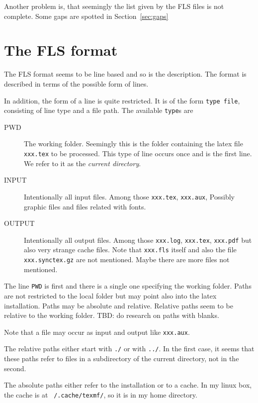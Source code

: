 \documentclass[a4paper]{article}
\begin{document}
Another problem is, that seemingly the list given by the FLS files 
is not complete. 
Some gaps are spotted in Section~\ref{sec:gaps}


\section{The FLS format}\label{sec:format}

The FLS format seems to be line based and so is the description. 
The format is described in terms of the possible form of lines. 

In addition, the form of a line is quite restricted. 
It is of the form \texttt{type file}, consisting of line type and a file path. 
The available \texttt{type}s are 
%
\begin{description}
  \item[PWD] The working folder. 
  Seemingly this is the folder containing the latex file \texttt{xxx.tex} to be processed. 
  This type of line occurs once and is the first line. 
  We refer to it as the \emph{current directory}. 
  \item[INPUT] Intentionally all input files. Among those \texttt{xxx.tex}, \texttt{xxx.aux}, 
  Possibly graphic files and files related with fonts. 
  \item[OUTPUT] Intentionally all output files. 
  Among those \texttt{xxx.log}, \texttt{xxx.tex}, \texttt{xxx.pdf}
  but also very strange cache files. 
  Note that \texttt{xxx.fls} itself and also the file \texttt{xxx.synctex.gz} are not mentioned. 
  Maybe there are more files not mentioned. 
\end{description}

The line \texttt{PWD} is first and there is a single one specifying the working folder. 
Paths are not restricted to the local folder but may point also into the latex installation. 
Paths may be absolute and relative. 
Relative paths seem to be relative to the working folder. 
TBD\@: do research on paths with blanks. 

Note that a file may occur as input and output like \texttt{xxx.aux}. 

The relative paths either start with \texttt{./} or with \texttt{../}. 
In the first case, it seems that these paths refer to files in a subdirectory 
of the current directory, not in the second. 

The absolute paths either refer to the installation or to a cache. 
In my linux box, the cache is at \texttt{~/.cache/texmf/}, so it is in my home directory. 
\end{document}
